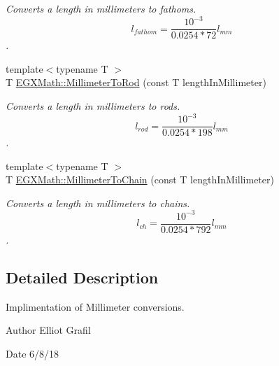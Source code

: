 \begin{DoxyCompactItemize}
\begin{DoxyCompactList}\small\item\em Converts a length in millimeters to fathoms. \[ l_{fathom}= \frac{10^{-3}}{0.0254 * 72} l_{mm} \]. \end{DoxyCompactList}\item 
{\footnotesize template$<$typename T $>$ }\\T \mbox{\hyperlink{group___e_g_x_math-_conversions-_length_conversions-_s_i-_millimeter-_surveyors_ga658a03332f16e17bdd23bd770091b221}{E\+G\+X\+Math\+::\+Millimeter\+To\+Rod}} (const T length\+In\+Millimeter)
\begin{DoxyCompactList}\small\item\em Converts a length in millimeters to rods. \[ l_{rod}= \frac{10^{-3}}{0.0254 * 198} l_{mm} \]. \end{DoxyCompactList}\item 
{\footnotesize template$<$typename T $>$ }\\T \mbox{\hyperlink{group___e_g_x_math-_conversions-_length_conversions-_s_i-_millimeter-_surveyors_gaacdbed15976b36734f17c99e024d96cd}{E\+G\+X\+Math\+::\+Millimeter\+To\+Chain}} (const T length\+In\+Millimeter)
\begin{DoxyCompactList}\small\item\em Converts a length in millimeters to chains. \[ l_{ch}= \frac{10^{-3}}{0.0254 * 792} l_{mm} \]. \end{DoxyCompactList}\end{DoxyCompactItemize}


\subsection{Detailed Description}
Implimentation of Millimeter conversions. 

\begin{DoxyAuthor}{Author}
Elliot Grafil 
\end{DoxyAuthor}
\begin{DoxyDate}{Date}
6/8/18 
\end{DoxyDate}
